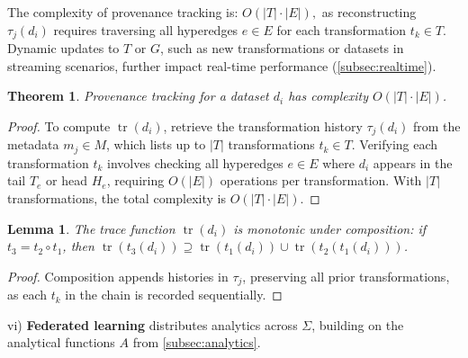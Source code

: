 \documentclass{amsart}
\newtheorem{thm}{Theorem}
\newtheorem{lem}{Lemma}
\DeclareMathOperator\tr{tr}
\begin{document}
The complexity of provenance tracking is:
$
O(|T| \cdot |E|),
$
as reconstructing \( \tau_j(d_i) \) requires traversing all hyperedges \( e \in E \) for each transformation \( t_k \in T \). Dynamic updates to \( T \) or \( G \), such as new transformations or datasets in streaming scenarios, further impact real-time performance (\cref{subsec:realtime}).

\begin{thm} \label{thm:provenance_complexity}
Provenance tracking for a dataset \( d_i \) has complexity \( O(|T| \cdot |E|) \).
\end{thm}

\begin{proof}
To compute \( \tr (d_i) \), retrieve the transformation history \( \tau_j(d_i) \) from the metadata \( m_j \in M \), which lists up to \( |T| \) transformations \( t_k \in T \). Verifying each transformation \( t_k \) involves checking all hyperedges \( e \in E \) where \( d_i \) appears in the tail \( T_e \) or head \( H_e \), requiring \( O(|E|) \) operations per transformation. With \( |T| \) transformations, the total complexity is \( O(|T| \cdot |E|) \).
\end{proof}

\begin{lem} \label{lem:provenance_monotonicity}
The trace function \( \tr (d_i) \) is monotonic under composition: if \( t_3 = t_2 \circ t_1 \), then \( \tr (t_3(d_i)) \supseteq \tr (t_1(d_i)) \cup \tr (t_2(t_1(d_i))) \).
\end{lem}

\begin{proof}
Composition appends histories in \( \tau_j \), preserving all prior transformations, as each \( t_k \) in the chain is recorded sequentially.
\end{proof}



vi) \textbf{Federated learning} distributes analytics across \( \Sigma \), building on the analytical functions \( A \) from \cref{subsec:analytics}.
\end{document}
